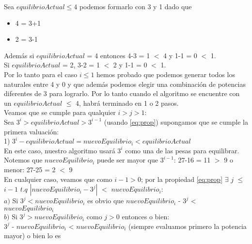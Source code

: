 Sea $equilibrioActual \leq 4 $ podemos formarlo con 3 y 1 dado que
\begin{itemize}
\item 4 = 3+1
\item 2 = 3-1
\end{itemize}

Además si $equilibrioActual$ = 4 entonces 4-3 = 1 $<$ 4 y 1-1 = 0 $<$ 1. \\

Si $equilibrioActual$ = 2, 3-2 = 1 $<$ 2 y 1-1 = 0 $<$ 1.\\ 

Por lo tanto para el caso $i \leq 1$ hemos probado que podemos generar todos los naturales entre 4 y 0 y que además podemos elegir una combinación de potencias diferentes de 3 para lograrlo. Por lo tanto cuando el algoritmo se encuentre con un $equilibrioActual$ $\leq$ 4, habrá terminado en 1 o 2 pasos.\\ 

Veamos que se cumple para qualquier $i > j > 1$: \\

Sea $3^i > equilibrioActual > 3^{i-1}$ (usando \eqref{eq:prop}) supongamos que se cumple la primera valuación: \\

1) $3^i - equilibrioActual = nuevoEquilibrio_{i} < equilibrioActual$ \\  

En este caso, nuestro algoritmo usará $3^i$ como una de las pesas para equilibrar. \\

Notemos que $nuevoEquilibrio_{i}$ puede ser mayor que $3^{i-1}$: 27-16 = 11 $>$ 9 o menor: 27-25 = 2 $<$ 9 \\

En cualquier caso, veamos que como $i-1 > 0$; por la propiedad \eqref{eq:prop} $\exists$ $j$ $\leq$ $i-1$ $t.q$  $|nuevoEquilibrio_{i} - 3^j|$ $<$ $nuevoEquilibrio_{i}$: \\

$a)$ Si $3^j < nuevoEquilibrio_{i}$ es obvio que $nuevoEquilibrio_{i}$ - $3^j$ < $nuevoEquilibrio_{i}$ \\
 
$b)$ Si $3^j > nuevoEquilibrio_{i}$ como $j > 0$ entonces o bien:\\

$3^j$ - $nuevoEquilibrio_{i}$ < $nuevoEquilibrio_{i}$ (siempre evaluamos primero la potencia mayor) o bien lo es \\  

